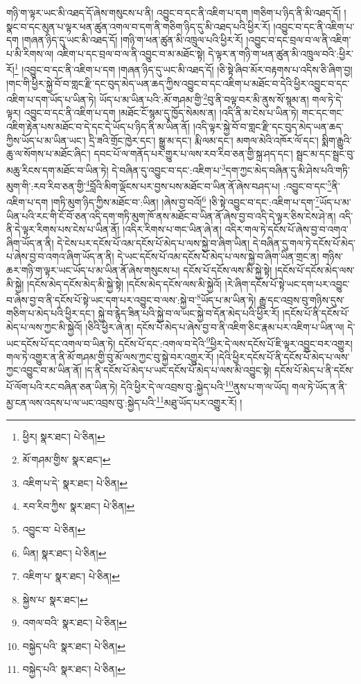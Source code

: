 གཉི་ག་ལྟར་ཡང་མི་འཐད་དོ་ཞེས་གསུངས་པ་ནི། འབྱུང་བ་དང་ནི་འཇིག་པ་དག །གཅིག་པ་ཉིད་ནི་མི་འཐད་དོ། །སྣང་བ་དང་མུན་པ་ལྟར་ཕན་ཚུན་འགལ་བ་དག་ནི་གཅིག་ཉིད་དུ་མི་འཐད་པའི་ཕྱིར་རོ། །འབྱུང་བ་དང་ནི་འཇིག་པ་དག །གཞན་ཉིད་དུ་ཡང་མི་འཐད་དོ། །གཉི་ག་ཕན་ཚུན་མི་འཁྲུལ་པའི་ཕྱིར་རོ། །འབྱུང་བ་དང་བྲལ་བ་ལ་ནི་འཇིག་པ་མི་རིགས་ལ། འཇིག་པ་དང་བྲལ་བ་ལ་ནི་འབྱུང་བ་མ་མཐོང་སྟེ། དེ་ལྟར་ན་གཉི་ག་ཕན་ཚུན་མི་འཁྲུལ་བའི་:ཕྱིར་རོ།\footnote{ཕྱིར།  སྣར་ཐང་།  པེ་ཅིན། } །འབྱུང་བ་དང་ནི་འཇིག་པ་དག །གཞན་ཉིད་དུ་ཡང་མི་འཐད་དོ། །ཅི་སྟེ་ཞིབ་མོར་བརྟགས་པ་འདིས་ཅི་ཞིག་བྱ། །གང་གི་ཕྱིར་སྐྱེ་བོ་བ་གླང་རྫི་དང་བུད་མེད་ཡན་ཆད་ཀྱིས་འབྱུང་བ་དང་འཇིག་པ་མཐོང་བ་དེའི་ཕྱིར་འབྱུང་བ་དང་འཇིག་པ་དག་ཡོད་པ་ཡིན་ཏེ། ཡོད་པ་མ་ཡིན་པའི་:མོ་གཤམ་གྱི་\footnote{མོ་གཤམ་གྱིས་  སྣར་ཐང་། }བུ་ནི་བལྟ་བར་མི་ནུས་སོ་སྙམ་ན། གལ་ཏེ་དེ་ལྟར། འབྱུང་བ་དང་ནི་འཇིག་པ་དག །མཐོང་ངོ་སྙམ་དུ་ཁྱོད་སེམས་ན། །འདི་ནི་མ་ངེས་པ་ཡིན་ཏེ། གང་དང་གང་འཇིག་རྟེན་པས་མཐོང་བ་དེ་དང་དེ་ཡོད་པ་ཉིད་ནི་མ་ཡིན་ནོ། །འདི་ལྟར་སྐྱེ་བོ་བ་གླང་རྫི་དང་བུད་མེད་ཡན་ཆད་ཀྱིས་ཡོད་པ་མ་ཡིན་ཡང་། དྲི་ཟའི་གྲོང་ཁྱེར་དང་། སྒྱུ་མ་དང་། རྨི་ལམ་དང་། མགལ་མེའི་འཁོར་ལོ་དང་། སྨིག་རྒྱུའི་ཆུ་ལ་སོགས་པ་མཐོང་ཞིང་། དབང་པོ་ལ་གནོད་པར་གྱུར་པ་ལས་རབ་རིབ་ཅན་གྱི་སྐྲ་ཤད་དང་། སྦྲང་མ་དང་སྦྲང་བུ་མཆུ་རིངས་དག་མཐོང་བ་ཡིན་ཏེ། དེ་བཞིན་དུ་འབྱུང་བ་དང་:འཇིག་པ་\footnote{འཇིག་པ་དེ་  སྣར་ཐང་།  པེ་ཅིན། }དག་ཀྱང་མེད་བཞིན་དུ་མི་ཤེས་པའི་གཏི་མུག་གི་:རབ་རིབ་ཅན་གྱི་\footnote{རབ་རིབ་ཀྱིས་  སྣར་ཐང་།  པེ་ཅིན། }བློའི་མིག་ལྡོངས་པར་བྱས་པས་མཐོང་བ་ཡིན་ནོ་ཞེས་བཤད་པ། :འབྱུང་བ་དང་\footnote{འབྱུང་བ་  པེ་ཅིན། }ནི་འཇིག་པ་དག །གཏི་མུག་ཉིད་ཀྱིས་མཐོང་བ་:ཡིན། །ཞེས་བྱ་བའོ།\footnote{ཡིན།  སྣར་ཐང་།  པེ་ཅིན། } །ཅི་སྟེ་འབྱུང་བ་དང་:འཇིག་པ་དག་\footnote{འཇིག་པ་  སྣར་ཐང་།  པེ་ཅིན། }ཡོད་པ་མ་ཡིན་པའི་རང་གི་ངོ་བོ་ཅན་འདི་དག་གཏི་མུག་ཁོ་ནས་མཐོང་བ་ཡིན་ནོ་ཞེས་བྱ་བ་འདི་དེ་ལྟར་ཅིས་ངེས་ཤེ་ན། འདི་ནི་དེ་ལྟར་རིགས་པས་ངེས་པ་ཡིན་ནོ། །འདིར་རིགས་པ་གང་ཡིན་ཞེ་ན། འདིར་གལ་ཏེ་དངོས་པོ་ཞེས་བྱ་བ་འགའ་ཞིག་ཡོད་ན་ནི། དེ་ངེས་པར་དངོས་པོ་འམ་དངོས་པོ་མེད་པ་ལས་སྐྱེ་བ་ཞིག་ཡིན། དེ་བཞིན་དུ་གལ་ཏེ་དངོས་པོ་མེད་པ་ཞེས་བྱ་བ་འགའ་ཞིག་ཡོད་ན་ནི། དེ་ཡང་དངོས་པོ་འམ་དངོས་པོ་མེད་པ་ལས་སྐྱེ་བ་ཞིག་ཡིན་གྲང་ན། གཉིས་ཆར་གཉི་ག་ལྟར་ཡང་ཡོད་པ་མ་ཡིན་ནོ་ཞེས་གསུངས་པ། དངོས་པོ་དངོས་ལས་མི་སྐྱེ་སྟེ། །དངོས་པོ་དངོས་མེད་ལས་མི་སྐྱེ། །དངོས་མེད་དངོས་མེད་མི་སྐྱེ་སྟེ། །དངོས་མེད་དངོས་ལས་མི་སྐྱེའོ། །རེ་ཞིག་དངོས་པོ་སྟེ་ཡང་དག་པར་འབྱུང་བ་ཞེས་བྱ་བ་ནི་དངོས་པོ་སྟེ་ཡང་དག་པར་འབྱུང་བ་ལས་:སྐྱེ་བ་\footnote{སྐྱེས་པ་  སྣར་ཐང་། }ཡོད་པ་མ་ཡིན་ཏེ། རྒྱུ་དང་འབྲས་བུ་གཉིས་དུས་གཅིག་པ་མེད་པའི་ཕྱིར་དང་། སྐྱེ་བ་རྙེད་ཟིན་པའི་སྐྱེ་བ་ལ་ཡང་སྐྱེ་བ་དོན་མེད་པའི་ཕྱིར་རོ། །དངོས་པོ་ནི་དངོས་པོ་མེད་པ་ལས་ཀྱང་མི་སྐྱེའོ། །ཅིའི་ཕྱིར་ཞེ་ན། དངོས་པོ་མེད་པ་ཞེས་བྱ་བ་ནི་འཇིག་ཅིང་རྣམ་པར་འཇིག་པ་ཡིན་ལ། དེ་ཡང་དངོས་པོ་དང་འགལ་བ་ཡིན་ཏེ། དངོས་པོ་དང་:འགལ་བ་དེའི་\footnote{འགལ་བའི་  སྣར་ཐང་།  པེ་ཅིན། }ཕྱིར་དེ་ལས་དངོས་པོ་ཇི་ལྟར་འབྱུང་བར་འགྱུར། གལ་ཏེ་འགྱུར་ན་ནི་མོ་གཤམ་གྱི་བུ་མོ་ལས་ཀྱང་བུ་སྐྱེ་བར་འགྱུར་རོ། །དེའི་ཕྱིར་དངོས་པོ་ནི་དངོས་པོ་མེད་པ་ལས་ཀྱང་འབྱུང་བ་མ་ཡིན་ནོ། །ད་ནི་དངོས་པོ་མེད་པ་ཡང་དངོས་པོ་མེད་པ་ལས་མི་འབྱུང་སྟེ། དངོས་པོ་མེད་པ་ནི་དངོས་པོ་ལོག་པའི་རང་བཞིན་ཅན་ཡིན་ཏེ། དེའི་ཕྱིར་དེ་ལ་འབྲས་བུ་:སྐྱེད་པའི་\footnote{བསྐྱེད་པའི་  སྣར་ཐང་།  པེ་ཅིན། }ནུས་པ་ག་ལ་ཡོད། གལ་ཏེ་ཡོད་ན་ནི་མྱ་ངན་ལས་འདས་པ་ལ་ཡང་འབྲས་བུ་:སྐྱེད་པའི་\footnote{བསྐྱེད་པའི་  སྣར་ཐང་།  པེ་ཅིན། }མཐུ་ཡོད་པར་འགྱུར་རོ། །
